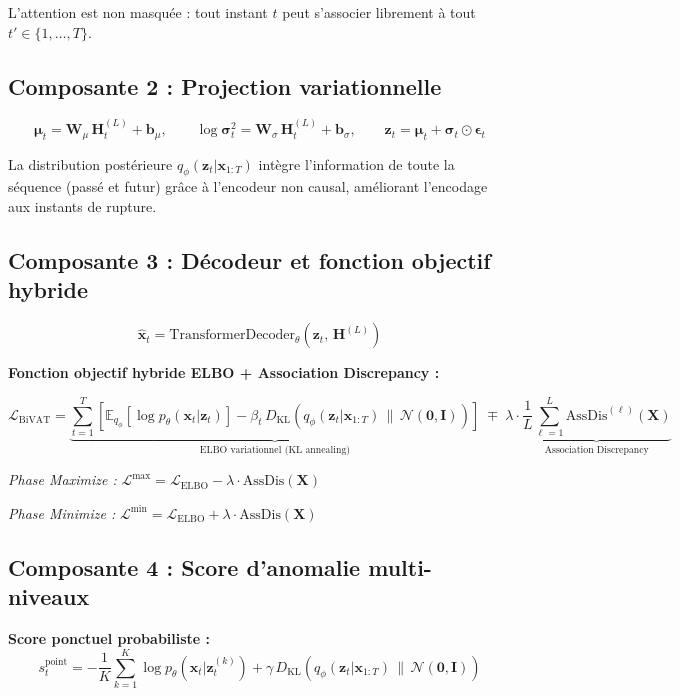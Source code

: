 \documentclass[12pt,a4paper]{article}
\begin{document}
L'attention est non masquée : tout instant $t$ peut s'associer librement à tout
$t' \in \{1, \ldots, T\}$.

\subsection{Composante 2 : Projection variationnelle}

$$\boldsymbol{\mu}_t = \mathbf{W}_\mu\,\mathbf{H}^{(L)}_t + \mathbf{b}_\mu,
\qquad
\log\boldsymbol{\sigma}^2_t = \mathbf{W}_\sigma\,\mathbf{H}^{(L)}_t +
\mathbf{b}_\sigma, \qquad
\mathbf{z}_t = \boldsymbol{\mu}_t + \boldsymbol{\sigma}_t \odot
\boldsymbol{\epsilon}_t$$

La distribution postérieure $q_\phi(\mathbf{z}_t|\mathbf{x}_{1:T})$ intègre
l'information de toute la séquence (passé et futur) grâce à l'encodeur non
causal, améliorant l'encodage aux instants de rupture.

\subsection{Composante 3 : Décodeur et fonction objectif hybride}

$$\hat{\mathbf{x}}_t = \mathrm{TransformerDecoder}_\theta(
\mathbf{z}_t,\,\mathbf{H}^{(L)})$$

\textbf{Fonction objectif hybride ELBO + Association Discrepancy :}

$$\mathcal{L}_{\mathrm{BiVAT}} =
\underbrace{\sum_{t=1}^T\!\left[
\mathbb{E}_{q_\phi}[\log p_\theta(\mathbf{x}_t|\mathbf{z}_t)]
- \beta_t\,D_{\mathrm{KL}}(q_\phi(\mathbf{z}_t|\mathbf{x}_{1:T})\,\|
\,\mathcal{N}(\mathbf{0},\mathbf{I}))\right]}_{\text{ELBO variationnel (KL annealing)}}
\;\mp\; \lambda \cdot
\underbrace{\frac{1}{L}\sum_{\ell=1}^L
\mathrm{AssDis}^{(\ell)}(\mathbf{X})}_{\text{Association Discrepancy}}$$

\textit{Phase Maximize :}
$\mathcal{L}^{\mathrm{max}} = \mathcal{L}_{\mathrm{ELBO}} -
\lambda \cdot \mathrm{AssDis}(\mathbf{X})$

\textit{Phase Minimize :}
$\mathcal{L}^{\mathrm{min}} = \mathcal{L}_{\mathrm{ELBO}} +
\lambda \cdot \mathrm{AssDis}(\mathbf{X})$

\subsection{Composante 4 : Score d'anomalie multi-niveaux}

\textbf{Score ponctuel probabiliste :}
$$s^{\mathrm{point}}_t = -\frac{1}{K}\sum_{k=1}^K
\log p_\theta(\mathbf{x}_t|\mathbf{z}_t^{(k)}) +
\gamma\,D_{\mathrm{KL}}(q_\phi(\mathbf{z}_t|\mathbf{x}_{1:T})\,\|
\,\mathcal{N}(\mathbf{0},\mathbf{I}))$$
\end{document}
